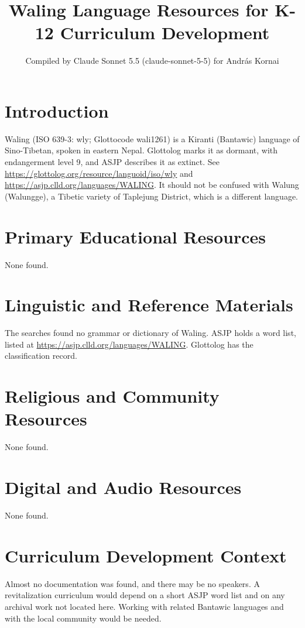 \documentclass[12pt]{article}
\title{Waling Language Resources for K-12 Curriculum Development}
\author{Compiled by Claude Sonnet 5.5 (claude-sonnet-5-5) for Andr\'as Kornai}
\date{}
\begin{document}
\maketitle

\section{Introduction}
Waling (ISO 639-3: wly; Glottocode wali1261) is a Kiranti (Bantawic) language of Sino-Tibetan, spoken in eastern Nepal. Glottolog marks it as dormant, with endangerment level 9, and ASJP describes it as extinct. See \url{https://glottolog.org/resource/languoid/iso/wly} and \url{https://asjp.clld.org/languages/WALING}. It should not be confused with Walung (Walungge), a Tibetic variety of Taplejung District, which is a different language.

\section{Primary Educational Resources}
None found.

\section{Linguistic and Reference Materials}
The searches found no grammar or dictionary of Waling. ASJP holds a word list, listed at \url{https://asjp.clld.org/languages/WALING}. Glottolog has the classification record.

\section{Religious and Community Resources}
None found.

\section{Digital and Audio Resources}
None found.

\section{Curriculum Development Context}
Almost no documentation was found, and there may be no speakers. A revitalization curriculum would depend on a short ASJP word list and on any archival work not located here. Working with related Bantawic languages and with the local community would be needed.
\end{document}
